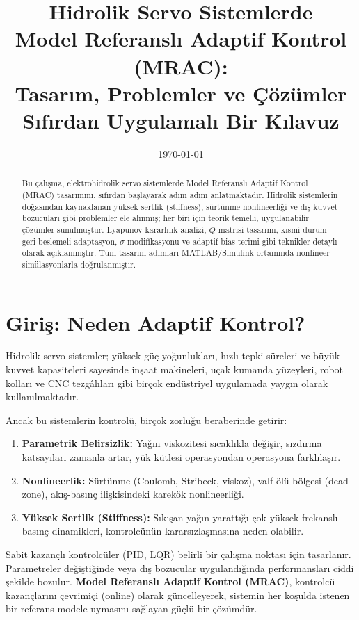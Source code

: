 \documentclass[12pt,a4paper]{article}
\title{
    \vspace{-1cm}
    \textbf{Hidrolik Servo Sistemlerde\\Model Referanslı Adaptif Kontrol (MRAC):\\Tasarım, Problemler ve Çözümler}\\[0.5cm]
    \large Sıfırdan Uygulamalı Bir Kılavuz
}
\author{}
\date{\today}
\begin{document}
\maketitle

\begin{abstract}
Bu çalışma, elektrohidrolik servo sistemlerde Model Referanslı Adaptif Kontrol (MRAC) tasarımını, sıfırdan başlayarak adım adım anlatmaktadır. Hidrolik sistemlerin doğasından kaynaklanan yüksek sertlik (stiffness), sürtünme nonlineerliği ve dış kuvvet bozucuları gibi problemler ele alınmış; her biri için teorik temelli, uygulanabilir çözümler sunulmuştur. Lyapunov kararlılık analizi, $Q$ matrisi tasarımı, kısmi durum geri beslemeli adaptasyon, $\sigma$-modifikasyonu ve adaptif bias terimi gibi teknikler detaylı olarak açıklanmıştır. Tüm tasarım adımları MATLAB/Simulink ortamında nonlineer simülasyonlarla doğrulanmıştır.
\end{abstract}

\tableofcontents
\newpage

\section{Giriş: Neden Adaptif Kontrol?}

Hidrolik servo sistemler; yüksek güç yoğunlukları, hızlı tepki süreleri ve büyük kuvvet kapasiteleri sayesinde inşaat makineleri, uçak kumanda yüzeyleri, robot kolları ve CNC tezgâhları gibi birçok endüstriyel uygulamada yaygın olarak kullanılmaktadır.

Ancak bu sistemlerin kontrolü, birçok zorluğu beraberinde getirir:

\begin{enumerate}
    \item \textbf{Parametrik Belirsizlik:} Yağın viskozitesi sıcaklıkla değişir, sızdırma katsayıları zamanla artar, yük kütlesi operasyondan operasyona farklılaşır.
    \item \textbf{Nonlineerlik:} Sürtünme (Coulomb, Stribeck, viskoz), valf ölü bölgesi (dead-zone), akış-basınç ilişkisindeki karekök nonlineerliği.
    \item \textbf{Yüksek Sertlik (Stiffness):} Sıkışan yağın yarattığı çok yüksek frekanslı basınç dinamikleri, kontrolcünün kararsızlaşmasına neden olabilir.
\end{enumerate}

Sabit kazançlı kontrolcüler (PID, LQR) belirli bir çalışma noktası için tasarlanır. Parametreler değiştiğinde veya dış bozucular uygulandığında performansları ciddi şekilde bozulur. \textbf{Model Referanslı Adaptif Kontrol (MRAC)}, kontrolcü kazançlarını çevrimiçi (online) olarak güncelleyerek, sistemin her koşulda istenen bir referans modele uymasını sağlayan güçlü bir çözümdür.
\end{document}
